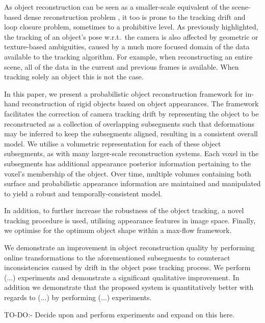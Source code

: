 As object reconstruction can be seen as a smaller-scale equivalent of the scene-based dense reconstruction problem , it too is prone to the
tracking drift and loop closure problem, sometimes to a prohibitive level. As previously highlighted, the tracking of an object's pose w.r.t.\ the camera is also affected 
by geometric or texture-based ambiguities, caused by a much more focused domain of the data available to the tracking algorithm.  For example, when reconstructing an 
entire scene, all of the data in the current and previous frames is available. When tracking solely an object this is not the case. 

In this paper, we present a probabilistic object reconstruction framework for in-hand reconstruction of rigid objects based on object
appearances.  The framework facilitates the correction of camera tracking drift by representing the object to be reconstructed as a
collection of overlapping subsegments such that deformations may be inferred to keep the subsegments aligned, resulting in a consistent
overall model. We utilise a volumetric representation for each of these object subsegments, as with many larger-scale reconstruction
systems\cite{Kahler2016}.  Each voxel in the subsegments has additional appearance posterior information pertaining to the voxel's membership of the object.
Over time, multiple volumes containing both surface and probabilistic appearance information are maintained and manipulated to yield a
robust and temporally-consistent model.

In addition, to further increase the robustness of the object tracking, a novel tracking procedure is used, utilising appearance features
in image space. Finally, we optimise for the optimum object shape within a max-flow framework.

We demonstrate an improvement in object reconstruction quality by performing online transformations to the aforementioned subsegments to counteract inconsistencies 
caused by drift in the object pose tracking process. 
We perform (...) experiments and demonstrate a significant qualitative improvement. In addition we demonstrate that the proposed system is quantitatively better 
with regards to (...) by performing (...) experiments.

TO-DO:- Decide upon and perform experiments and expand on this here.
